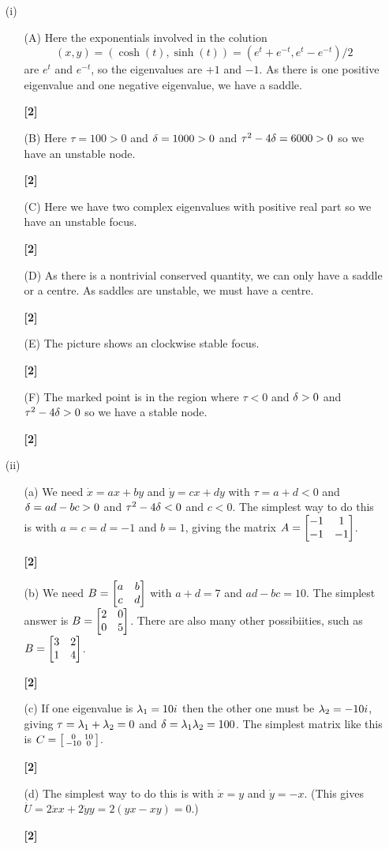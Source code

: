 \documentclass[a4paper]{article}
\newcounter{probcounter}
\newcounter{marksawarded}
\newcommand{\mks}[1]{%
\addtocounter{marksawarded}{#1}%
\textbf{\color{red}[#1]}}
\newenvironment{solution}{\comment}{\endcomment}
\newenvironment{solution}{
{\bigskip\par\noindent \bf Solution:}}{
\newpage
\typeout{Q\arabic{probcounter}: \arabic{marksawarded} marks awarded}
}
\begin{document}
\begin{solution}\leavevmode
 \begin{itemize}
  \item[(i)]
   \begin{itemize}
    \item[(A)] Here the exponentials involved in the colution
     \[ (x,y) = (\cosh(t),\sinh(t)) = (e^t+e^{-t},e^t-e^{-t})/2 \]
     are $e^t$ and $e^{-t}$, so the eigenvalues are $+1$ and $-1$.  As
     there is one positive eigenvalue and one negative eigenvalue, we
     have a saddle. \mks{2}
    \item[(B)] Here $\tau=100>0$ and $\delta=1000>0$ and
     $\tau^2-4\delta=6000>0$ so we have an unstable node. \mks{2}
    \item[(C)] Here we have two complex eigenvalues with positive real
     part so we have an unstable focus. \mks{2}
    \item[(D)] As there is a nontrivial conserved quantity, we can
     only have a saddle or a centre.  As saddles are unstable, we must
     have a centre.  \mks{2}
    \item[(E)] The picture shows an clockwise stable focus. \mks{2}
    \item[(F)] The marked point is in the region where $\tau<0$ and
     $\delta > 0$ and $\tau^2-4\delta > 0$ so we have a stable node.  \mks{2}
   \end{itemize}
  \item[(ii)] 
   \begin{itemize}
    \item[(a)] We need $\dot{x}=ax+by$ and $\dot{y}=cx+dy$ with
     $\tau=a+d<0$ and $\delta=ad-bc>0$ and $\tau^2-4\delta < 0$ and $c<0$.
     The simplest way to do this is with $a=c=d=-1$ and $b=1$, giving
     the matrix $A=\left[\begin{matrix} -1 & 1 \\ -1 & -1\end{matrix}\right]$.  \mks{2}
    \item[(b)] We need $B=\left[\begin{matrix} a&b\\c&d\end{matrix}\right]$ with $a+d=7$ and
     $ad-bc=10$.  The simplest answer is $B=\left[\begin{matrix} 2&0\\0&5\end{matrix}\right]$.  There
     are also many other possibiities, such as 
     $B=\left[\begin{matrix} 3&2\\1&4\end{matrix}\right]$.  \mks{2}
    \item[(c)] If one eigenvalue is $\lambda_1=10i$ then the other one must be
     $\lambda_2=-10i$, giving $\tau=\lambda_1+\lambda_2=0$ and
     $\delta=\lambda_1\lambda_2=100$.  The simplest matrix like this is
     $C=\left[\begin{smallmatrix} 0&10\\-10&0\end{smallmatrix}\right]$. \mks{2}
    \item[(d)] The simplest way to do this is with $\dot{x}=y$ and
     $\dot{y}=-x$.  (This gives $\dot{U}=2\dot{x}x+2\dot{y}y=2(yx-xy)=0$.)
     \mks{2}
  \end{itemize}
 \end{itemize}
\end{solution}
\end{document}
